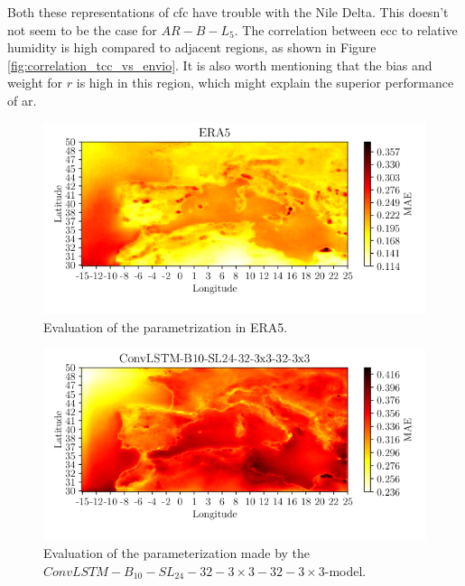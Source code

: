 Both these representations of \acrshort{cfc} have trouble with the Nile Delta. This doesn't not seem to be the case for $AR-B-L_5$. The correlation between \acrshort{ecc} to relative humidity is high compared to adjacent regions, as shown in Figure \ref{fig:correlation_tcc_vs_envio}. It is also worth mentioning that the bias and weight for $r$ is high in this region, which might explain the superior performance of \acrshort{ar}.
\begin{figure}[ht]
    \centering
    \includegraphics{python_figs/mae_era_vs_target_test_period_2014_to_2018.png}
    \caption{Evaluation of the parametrization in ERA5.}
    \label{fig:MAE_era}
\end{figure}
\begin{figure}[ht]
    \centering
    \includegraphics{python_figs/mae_convlstm_vs_target_test_period_2014_to_2018.png}
    \caption{Evaluation of the parameterization made by the $ConvLSTM-B_{10}-SL_{24}-32-3\times3-32-3 \times3$-model.}
    \label{fig:MAE_convlstm}
\end{figure}
